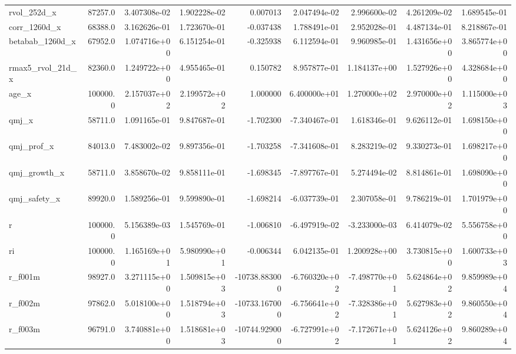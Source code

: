 \documentclass[10pt]{article}
\begin{document}
\begin{landscape}
\begin{longtable}{lrrrrrrrr}
rvol\_252d\_x             &   87257.0 &  3.407308e-02 &  1.902228e-02 &      0.007013 &  2.047494e-02 &  2.996600e-02 &  4.261209e-02 &  1.689545e-01 \\
corr\_1260d\_x            &   68388.0 &  3.162626e-01 &  1.723670e-01 &     -0.037438 &  1.788491e-01 &  2.952028e-01 &  4.487134e-01 &  8.218867e-01 \\
betabab\_1260d\_x         &   67952.0 &  1.074716e+00 &  6.151254e-01 &     -0.325938 &  6.112594e-01 &  9.960985e-01 &  1.431656e+00 &  3.865774e+00 \\
rmax5\_rvol\_21d\_x        &   82360.0 &  1.249722e+00 &  4.955465e-01 &      0.150782 &  8.957877e-01 &  1.184137e+00 &  1.527926e+00 &  4.328684e+00 \\
age\_x                   &  100000.0 &  2.157037e+02 &  2.199572e+02 &      1.000000 &  6.400000e+01 &  1.270000e+02 &  2.970000e+02 &  1.115000e+03 \\
qmj\_x                   &   58711.0 &  1.091165e-01 &  9.847687e-01 &     -1.702300 & -7.340467e-01 &  1.618346e-01 &  9.626112e-01 &  1.698150e+00 \\
qmj\_prof\_x              &   84013.0 &  7.483002e-02 &  9.897356e-01 &     -1.703258 & -7.341608e-01 &  8.283219e-02 &  9.330273e-01 &  1.698217e+00 \\
qmj\_growth\_x            &   58711.0 &  3.858670e-02 &  9.858111e-01 &     -1.698345 & -7.897767e-01 &  5.274494e-02 &  8.814861e-01 &  1.698090e+00 \\
qmj\_safety\_x            &   89920.0 &  1.589256e-01 &  9.599890e-01 &     -1.698214 & -6.037739e-01 &  2.307058e-01 &  9.786219e-01 &  1.701979e+00 \\
r                       &  100000.0 &  5.156389e-03 &  1.545769e-01 &     -1.006810 & -6.497919e-02 & -3.233000e-03 &  6.414079e-02 &  5.556758e+00 \\
ri                      &  100000.0 &  1.165169e+01 &  5.980990e+01 &     -0.006344 &  6.042135e-01 &  1.200928e+00 &  3.730815e+00 &  1.600733e+03 \\
r\_f001m                 &   98927.0 &  3.271115e+00 &  1.509815e+03 & -10738.883000 & -6.760320e+02 & -7.498770e+01 &  5.624864e+02 &  9.859989e+04 \\
r\_f002m                 &   97862.0 &  5.018100e+00 &  1.518794e+03 & -10733.167000 & -6.756641e+02 & -7.328386e+01 &  5.627983e+02 &  9.860550e+04 \\
r\_f003m                 &   96791.0 &  3.740881e+00 &  1.518681e+03 & -10744.929000 & -6.727991e+02 & -7.172671e+01 &  5.624126e+02 &  9.860289e+04 \\

\end{longtable}
\end{landscape}
\end{document}

